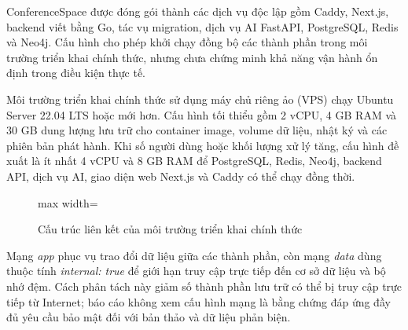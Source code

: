 ConferenceSpace được đóng gói thành các dịch vụ độc lập gồm Caddy, Next.js, backend viết bằng Go, tác vụ migration, dịch vụ AI FastAPI, PostgreSQL, Redis và Neo4j. Cấu hình cho phép khởi chạy đồng bộ các thành phần trong môi trường triển khai chính thức, nhưng chưa chứng minh khả năng vận hành ổn định trong điều kiện thực tế.

Môi trường triển khai chính thức sử dụng máy chủ riêng ảo (VPS) chạy Ubuntu Server 22.04 LTS hoặc mới hơn. Cấu hình tối thiểu gồm 2 vCPU, 4 GB RAM và 30 GB dung lượng lưu trữ cho container image, volume dữ liệu, nhật ký và các phiên bản phát hành. Khi số người dùng hoặc khối lượng xử lý tăng, cấu hình đề xuất là ít nhất 4 vCPU và 8 GB RAM để PostgreSQL, Redis, Neo4j, backend API, dịch vụ AI, giao diện web Next.js và Caddy có thể chạy đồng thời.

\begin{figure}[H]
  \centering
  \begin{adjustbox}{max width=\textwidth}
  \end{adjustbox}
  \caption{Cấu trúc liên kết của môi trường triển khai chính thức}
  \label{fig:ch3-32}
\end{figure}

Mạng \textit{app} phục vụ trao đổi dữ liệu giữa các thành phần, còn mạng \textit{data} dùng thuộc tính \textit{internal: true} để giới hạn truy cập trực tiếp đến cơ sở dữ liệu và bộ nhớ đệm. Cách phân tách này giảm số thành phần lưu trữ có thể bị truy cập trực tiếp từ Internet; báo cáo không xem cấu hình mạng là bằng chứng đáp ứng đầy đủ yêu cầu bảo mật đối với bản thảo và dữ liệu phản biện.

